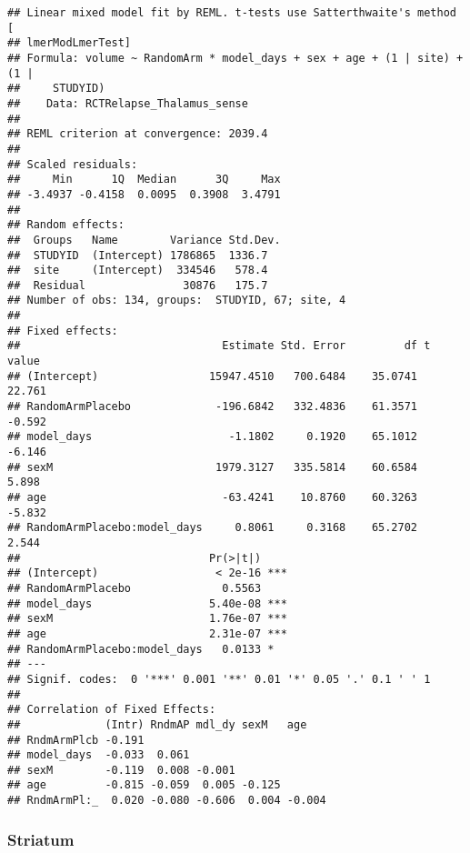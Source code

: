\documentclass[]{article}
\theoremstyle{definition}
\theoremstyle{definition}
\theoremstyle{definition}
\theoremstyle{remark}
\begin{document}
\begin{verbatim}
## Linear mixed model fit by REML. t-tests use Satterthwaite's method [
## lmerModLmerTest]
## Formula: volume ~ RandomArm * model_days + sex + age + (1 | site) + (1 |  
##     STUDYID)
##    Data: RCTRelapse_Thalamus_sense
## 
## REML criterion at convergence: 2039.4
## 
## Scaled residuals: 
##     Min      1Q  Median      3Q     Max 
## -3.4937 -0.4158  0.0095  0.3908  3.4791 
## 
## Random effects:
##  Groups   Name        Variance Std.Dev.
##  STUDYID  (Intercept) 1786865  1336.7  
##  site     (Intercept)  334546   578.4  
##  Residual               30876   175.7  
## Number of obs: 134, groups:  STUDYID, 67; site, 4
## 
## Fixed effects:
##                               Estimate Std. Error         df t value
## (Intercept)                 15947.4510   700.6484    35.0741  22.761
## RandomArmPlacebo             -196.6842   332.4836    61.3571  -0.592
## model_days                     -1.1802     0.1920    65.1012  -6.146
## sexM                         1979.3127   335.5814    60.6584   5.898
## age                           -63.4241    10.8760    60.3263  -5.832
## RandomArmPlacebo:model_days     0.8061     0.3168    65.2702   2.544
##                             Pr(>|t|)    
## (Intercept)                  < 2e-16 ***
## RandomArmPlacebo              0.5563    
## model_days                  5.40e-08 ***
## sexM                        1.76e-07 ***
## age                         2.31e-07 ***
## RandomArmPlacebo:model_days   0.0133 *  
## ---
## Signif. codes:  0 '***' 0.001 '**' 0.01 '*' 0.05 '.' 0.1 ' ' 1
## 
## Correlation of Fixed Effects:
##             (Intr) RndmAP mdl_dy sexM   age   
## RndmArmPlcb -0.191                            
## model_days  -0.033  0.061                     
## sexM        -0.119  0.008 -0.001              
## age         -0.815 -0.059  0.005 -0.125       
## RndmArmPl:_  0.020 -0.080 -0.606  0.004 -0.004
\end{verbatim}

\subsubsection{Striatum}\label{striatum-1}
\end{document}

